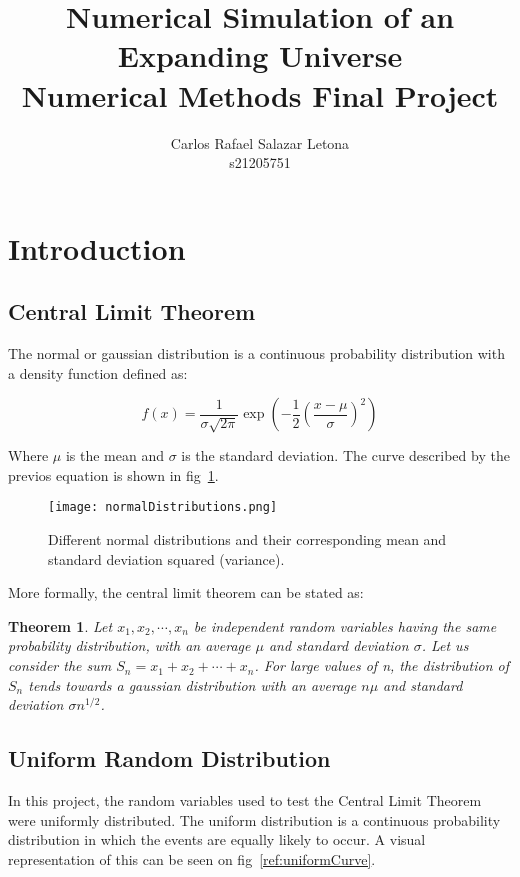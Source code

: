 \documentclass[12pt]{article}
\newtheorem{theorem}{Theorem}
\begin{document}
\title{Numerical Simulation of an Expanding Universe \\ Numerical Methods Final Project}
\author{Carlos Rafael Salazar Letona \\ s21205751}
\maketitle

\section*{Introduction}

\subsection*{Central Limit Theorem}
The normal or gaussian distribution is a continuous probability distribution with a density function defined as:

\begin{equation}
	f(x) = \frac{1}{\sigma \sqrt{2 \pi}} \exp \left( -\frac{1}{2} {\left( \frac{x - \mu}{\sigma}\right)}^{2}\right)
\end{equation}

Where \(\mu\) is the mean and \(\sigma\) is the standard deviation\cite{ref:normalWiki}. The curve described by the previos equation is shown in fig~\ref{ref:normalCurve}.

\begin{figure}[H]
	\centering
	\texttt{[image: normalDistributions.png]}
	\caption{Different normal distributions and their corresponding mean and standard deviation squared (variance)\cite{ref:normalWiki}.}
	\label{ref:normalCurve}
\end{figure}

More formally, the central limit theorem can be stated as:

\begin{theorem}
	Let \(x_{1}, x_{2}, \cdots, x_{n}\) be independent random variables having the same probability distribution, with an average \(\mu\) and standard deviation \(\sigma\). Let us consider the sum \(S_{n} = x_{1} + x_{2} + \cdots + x_{n}\). For large values of n, the distribution of \(S_{n}\) tends towards a gaussian distribution with an average \(n \mu\) and standard deviation \(\sigma n^{1/2}\).
\end{theorem}

\subsection*{Uniform Random Distribution}
In this project, the random variables used to test the Central Limit Theorem were uniformly distributed. The uniform distribution is a continuous probability distribution in which the events are equally likely to occur. A visual representation of this can be seen on fig~\ref{ref:uniformCurve}.
\end{document}
